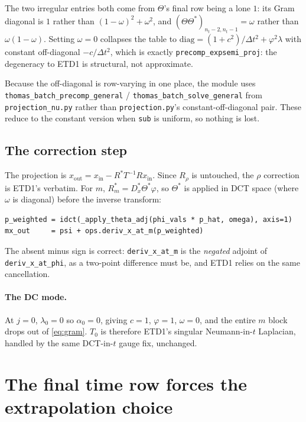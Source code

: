 \documentclass[11pt]{article}
\newcommand{\dt}{\Delta t}
\newcommand{\code}[1]{\texttt{#1}}
\begin{document}
\noindent
The two irregular entries both come from $\Theta$'s final row being a lone $1$: its Gram
diagonal is $1$ rather than $(1-\omega)^2+\omega^2$, and
$(\Theta\Theta^*)_{n_t-2,n_t-1}=\omega$ rather than $\omega(1-\omega)$. Setting
$\omega=0$ collapses the table to $\mathrm{diag}=(1+c^2)/\dt^2+\varphi^2\lambda$ with
constant off-diagonal $-c/\dt^2$, which is exactly \code{precomp\_expsemi\_proj}: the
degeneracy to ETD1 is structural, not approximate.

Because the off-diagonal is row-varying in one place, the module uses
\code{thomas\_batch\_precomp\_general} / \code{thomas\_batch\_solve\_general} from
\code{projection\_nu.py} rather than \code{projection.py}'s constant-off-diagonal pair.
These reduce to the constant version when \code{sub} is uniform, so nothing is lost.

\subsection{The correction step}

The projection is $x_{\mathrm{out}}=x_{\mathrm{in}}-R^*T^{-1}Rx_{\mathrm{in}}$. Since
$R_\rho$ is untouched, the $\rho$ correction is ETD1's verbatim. For $m$,
$R_m^*=D_x^*\Theta^*\varphi$, so $\Theta^*$ is applied in DCT space (where $\omega$ is
diagonal) before the inverse transform:
\begin{lstlisting}
p_weighted = idct(_apply_theta_adj(phi_vals * p_hat, omega), axis=1)
mx_out     = psi + ops.deriv_x_at_m(p_weighted)
\end{lstlisting}
The absent minus sign is correct: \code{deriv\_x\_at\_m} is the \emph{negated} adjoint of
\code{deriv\_x\_at\_phi}, as a two-point difference must be, and ETD1 relies on the same
cancellation.

\paragraph{The DC mode.} At $j=0$, $\lambda_0=0$ so $\alpha_0=0$, giving $c=1$,
$\varphi=1$, $\omega=0$, and the entire $m$ block drops out of \eqref{eq:gram}. $T_0$ is
therefore ETD1's singular Neumann-in-$t$ Laplacian, handled by the same DCT-in-$t$ gauge
fix, unchanged.

\section{The final time row forces the extrapolation choice}
\label{sec:lastrow}
\end{document}
